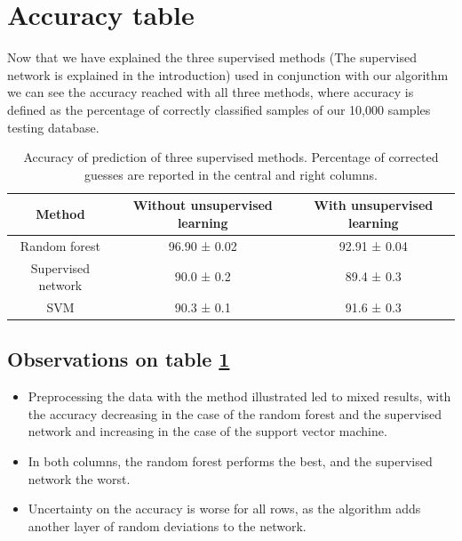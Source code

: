 \documentclass[a4paper]{report}
\begin{document}

\section{Accuracy table}

Now that we have explained the three supervised methods (The supervised network is explained in the introduction) used in conjunction with our algorithm we can see the accuracy reached with all three methods, where accuracy is defined as the percentage of correctly classified samples of our 10,000 samples testing database.

\begin{table}[h!]
  \begin{center}
    \begin{tabular}{c|c|c} %
      \textbf{Method} & \textbf{Without unsupervised learning} & \textbf{With unsupervised learning}\\
      \hline
      Random forest & 96.90  ± 0.02 & 92.91 ± 0.04\\
      Supervised network & 90.0 ± 0.2 & 89.4 ± 0.3 \\
      SVM & 90.3 ± 0.1 & 91.6 ± 0.3 \\
    \end{tabular}
  \end{center}
  \caption{Accuracy of prediction of three supervised methods. Percentage of corrected guesses are reported in the central and right columns.}
  \label{bbb}
\end{table}

\subsection{Observations on table \ref{bbb}}

\begin{itemize}
    \item Preprocessing the data with the method illustrated led to mixed results, with the accuracy decreasing in the case of the random forest and the supervised network and increasing in the case of the support vector machine.
    \item In both columns, the random forest performs the best, and the supervised network the worst.
    \item Uncertainty on the accuracy is worse for all rows, as the algorithm adds another layer of random deviations to the network.
\end{itemize}
\end{document}
